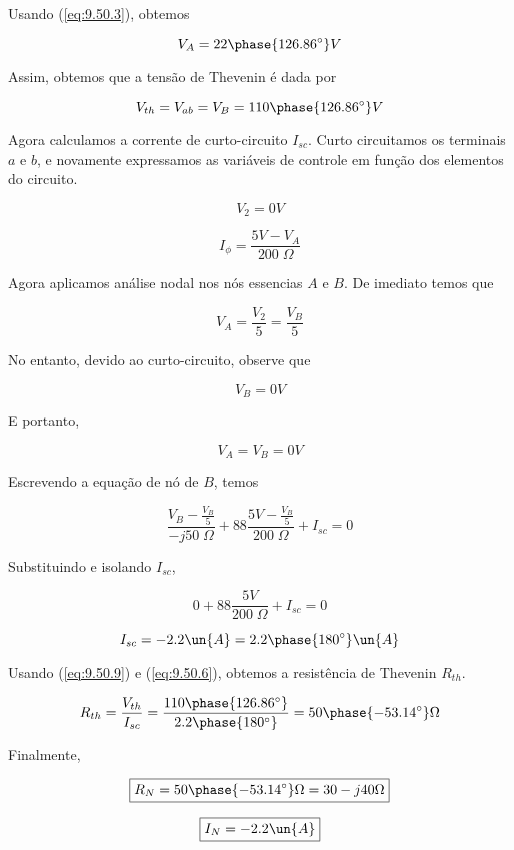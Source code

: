 Usando (\ref{eq:9.50.3}), obtemos

\begin{equation}\label{eq:9.50.5}
    V_{A} = 22\phase{126.86^{\circ}} V
\end{equation}

Assim, obtemos que a tensão de Thevenin é dada por

\begin{equation}\label{eq:9.50.6}
    V_{th} = V_{ab} = V_B = 110\phase{126.86^{\circ}} V
\end{equation}

Agora calculamos a corrente de curto-circuito \( I_{sc}\). 
Curto circuitamos os terminais \( a \) e \( b \), e novamente expressamos as variáveis de controle em função dos elementos
do circuito.

\begin{equation}\label{eq:9.50.7}
    V_{2} = 0 V
\end{equation}

\begin{equation}\label{eq:9.50.8}
    I_{\phi} = \frac{5V - V_A}{200 \;\Omega}
\end{equation}

Agora aplicamos análise nodal nos nós essencias \(A\) e \( B \).
De imediato temos que

\[ V_{A} = \frac{V_2}{5} = \frac{V_B}{5} \]

No entanto, devido ao curto-circuito, observe que 

\[ V_B = 0V \]

E portanto,

\[ V_A = V_B = 0V \]

Escrevendo a equação de nó de \(B\), temos

\[ \frac{V_B - \frac{V_B}{5}}{-j50 \;\Omega} + 88\frac{5V - \frac{V_B}{5}}{200 \;\Omega} + I_{sc} = 0 \]

Substituindo e isolando  \(I_{sc}\),

\[ 0 + 88\frac{5V}{200 \;\Omega} + I_{sc} = 0 \]

\begin{equation}\label{eq:9.50.9}
    I_{sc} = - 2.2 \un{A} = 2.2\phase{180^{\circ}} \un{A}
\end{equation}

Usando (\ref{eq:9.50.9}) e (\ref{eq:9.50.6}), obtemos a resistência de Thevenin \( R_{th} \).

\begin{equation}\label{eq:9.50.10}
    R_{th} = \frac{V_{th}}{I_{sc}} = \frac{110\phase{126.86^{\circ}}}{2.2\phase{180^{\circ}}} = 50\phase{-53.14^{\circ}} \Omega
\end{equation}

Finalmente,

\[ \boxed{R_{N} = 50\phase{-53.14^{\circ}} \Omega = 30 - j40 \Omega}  \]

\[ \boxed{I_{N} = - 2.2 \un{A}}  \]








